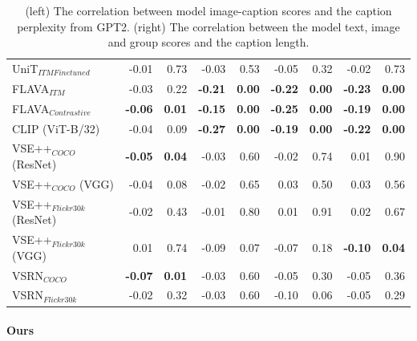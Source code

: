 \begin{table}[ht]
\begin{adjustbox}{max width=\textwidth}
\begin{tabular}{l|rr|rrrrrr}
 UniT$_{ITM Finetuned}$       & -0.01          & 0.73          & -0.03          & 0.53          & -0.05          & 0.32          & -0.02          & 0.73          \\
 FLAVA$_{ITM}$                & -0.03          & 0.22          & \textbf{-0.21} & \textbf{0.00} & \textbf{-0.22} & \textbf{0.00} & \textbf{-0.23} & \textbf{0.00} \\
 FLAVA$_{Contrastive}$        & \textbf{-0.06} & \textbf{0.01} & \textbf{-0.15} & \textbf{0.00} & \textbf{-0.25} & \textbf{0.00} & \textbf{-0.19} & \textbf{0.00} \\
 CLIP (ViT-B/32)              & -0.04          & 0.09          & \textbf{-0.27} & \textbf{0.00} & \textbf{-0.19} & \textbf{0.00} & \textbf{-0.22} & \textbf{0.00} \\
 VSE++$_{COCO}$ (ResNet)      & \textbf{-0.05} & \textbf{0.04} & -0.03          & 0.60          & -0.02          & 0.74          & 0.01           & 0.90          \\
 VSE++$_{COCO}$ (VGG)         & -0.04          & 0.08          & -0.02          & 0.65          & 0.03           & 0.50          & 0.03           & 0.56          \\
 VSE++$_{Flickr30k}$ (ResNet) & -0.02          & 0.43          & -0.01          & 0.80          & 0.01           & 0.91          & 0.02           & 0.67          \\
 VSE++$_{Flickr30k}$ (VGG)    & 0.01           & 0.74          & -0.09          & 0.07          & -0.07          & 0.18          & \textbf{-0.10} & \textbf{0.04} \\
 VSRN$_{COCO}$                & \textbf{-0.07} & \textbf{0.01} & -0.03          & 0.60          & -0.05          & 0.30          & -0.05          & 0.36          \\
 VSRN$_{Flickr30k}$           & -0.02          & 0.32          & -0.03          & 0.60          & -0.10          & 0.06          & -0.05          & 0.29          \\
\bottomrule
\end{tabular}
\end{adjustbox}
\caption{(left) The correlation between model image-caption scores and the caption perplexity from GPT2. (right) The correlation between the model text, image and group scores and the caption length.}
\label{tab:perplexity-and-length-correlations-baseline}
\end{table}

\paragraph{Ours}

